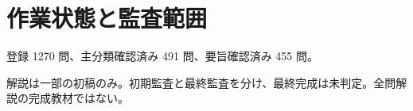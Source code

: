 \chapter{作業状態と監査範囲}
登録 1270 問、主分類確認済み 491 問、要旨確認済み 455 問。
\par 解説は一部の初稿のみ。初期監査と最終監査を分け、最終完成は未判定。全問解説の完成教材ではない。
